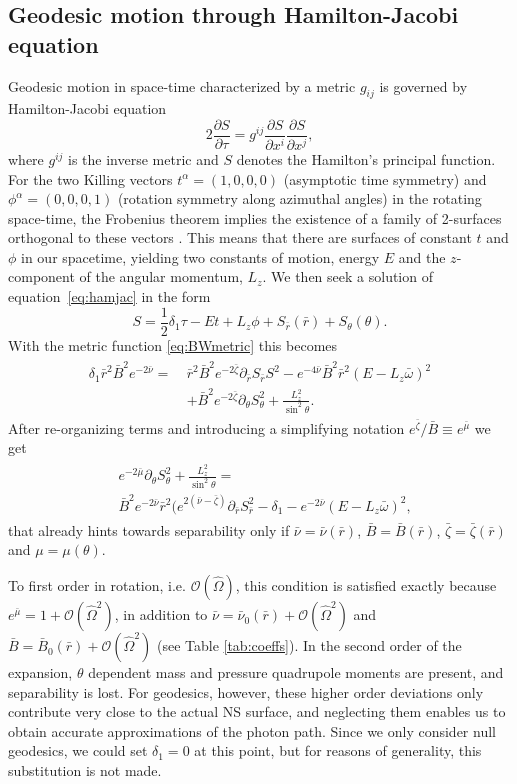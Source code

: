 \documentclass[iop, usenatbib]{emulateapj}
\newcommand{\be}{\begin{equation}}
\newcommand{\ee}{\end{equation}}
\newcommand{\pd}{\ensuremath{\partial}} %
\newcommand{\rb}{\ensuremath{\bar{r}}}
\newcommand{\wb}{\ensuremath{\bar{\omega}}}
\newcommand{\Ob}{\ensuremath{\hat{\Omega}}}
\newcommand{\nub}{\ensuremath{\bar{\nu}}}
\newcommand{\zetab}{\ensuremath{\bar{\zeta}}}
\newcommand{\Bb}{\ensuremath{\bar{B}}}
\newcommand{\mub}{\ensuremath{\bar{\mu}}}
\begin{document}
\subsection{Geodesic motion through Hamilton-Jacobi equation}
Geodesic motion in space-time characterized by a metric $g_{ij}$ is governed by Hamilton-Jacobi equation
\be\label{eq:hamjac}
2\frac{\pd S}{\pd \tau} = g^{ij} \frac{\pd S}{\pd x^i}\frac{\pd S}{\pd x^j},
\ee
where $g^{ij}$ is the inverse metric and $S$ denotes the Hamilton's principal function.
For the two Killing vectors $t^{\alpha} = (1,0,0,0)$ (asymptotic time symmetry) and $\phi^{\alpha} = (0,0,0,1)$ (rotation symmetry along azimuthal angles) in the rotating space-time, the Frobenius theorem implies the existence of a family of 2-surfaces orthogonal to these vectors \citep[see e.g][p.12]{rcs}.  
This means that there are surfaces of constant $t$ and $\phi$ in our spacetime, yielding two constants of motion, energy $E$ and the $z$-component of the angular momentum, $L_z$.  
We then seek a solution of equation~\eqref{eq:hamjac} in the form
\be
S = \frac{1}{2}\delta_1 \tau - Et + L_z\phi + S_{\rb}(\rb) + S_{\theta}(\theta).
\ee
With the metric function \eqref{eq:BWmetric} this becomes
\begin{align}\begin{split} 
    \delta_1 \rb^2 \Bb^2 e^{-2\nub} =~& \rb^2 \Bb^2 e^{-2\zetab} \pd_{\rb}S_{\rb}S^2 - e^{-4\nub} \Bb^2 \rb^2 (E - L_z \wb)^2 \\
                                & + \Bb^2 e^{-2\zetab} \pd_{\theta}S_{\theta}^2 + \frac{L_z^2}{\sin^2\theta}.
\end{split}\end{align}
After re-organizing terms and introducing a simplifying notation $e^{\zetab}/\Bb \equiv e^{\mub}$ we get
\begin{align}\begin{split}\label{eq:S}
& e^{-2\mub}\pd_{\theta}S_{\theta}^2 + \frac{L_z^2}{\sin^2\theta} = \\ 
& \Bb^2 e^{-2\nub}\rb^2 ( e^{2(\nub-\zetab)} \pd_{\rb}S_{\rb}^2 -\delta_{1} - e^{-2\nub}(E - L_z \wb)^2,
\end{split}\end{align}
that already hints towards separability only if $\nub = \nub(\rb)$, $\Bb = \Bb(\rb)$, $\zetab = \zetab(\rb)$ and $\mu = \mu(\theta)$.

To first order in rotation, i.e. $\mathcal{O}(\Ob)$, this condition is satisfied exactly because $e^{\mub} = 1 + \mathcal{O}(\Ob^2)$, in addition to $\nub = \nub_0(\rb) + \mathcal{O}(\Ob^2)$ and $\Bb = \Bb_0(\rb) + \mathcal{O}(\Ob^2)$ (see Table \ref{tab:coeffs}).  
In the second order of the expansion, $\theta$ dependent mass and pressure quadrupole moments are present, and separability is lost.
For geodesics, however, these higher order deviations only contribute very close to the actual NS surface, and neglecting them enables us to obtain accurate approximations of the photon path.
Since we only consider null geodesics, we could set $\delta_1 = 0$ at this point, but for reasons of generality, this substitution is not made.
\end{document}
